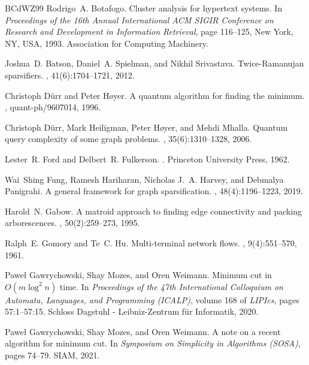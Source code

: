 \documentclass[10pt,a4paper]{article}
\newcommand{\1}{\mathbf{1}}
\theoremstyle{definition}
\begin{document}
\begin{thebibliography}{BCdWZ99}
Rodrigo~A. Botafogo.
\newblock Cluster analysis for hypertext systems.
\newblock In {\em Proceedings of the 16th Annual International ACM SIGIR
  Conference on Research and Development in Information Retrieval}, page
  116–125, New York, NY, USA, 1993. Association for Computing Machinery.

Joshua~D. Batson, Daniel~A. Spielman, and Nikhil Srivastava.
\newblock Twice-{R}amanujan sparsifiers.
, 41(6):1704--1721, 2012.

Christoph D{\"{u}}rr and Peter H{\o}yer.
\newblock A quantum algorithm for finding the minimum.
, quant-ph/9607014, 1996.

Christoph D{\"{u}}rr, Mark Heiligman, Peter H{\o}yer, and Mehdi Mhalla.
\newblock Quantum query complexity of some graph problems.
, 35(6):1310--1328, 2006.

Lester~R. Ford and Delbert~R. Fulkerson.
.
\newblock Princeton University Press, 1962.

Wai~Shing Fung, Ramesh Hariharan, Nicholas J.~A. Harvey, and Debmalya
  Panigrahi.
\newblock A general framework for graph sparsification.
, 48(4):1196--1223, 2019.

Harold~N. Gabow.
\newblock A matroid approach to finding edge connectivity and packing
  arborescences.
, 50(2):259--273, 1995.

Ralph~E. Gomory and Te~C. Hu.
\newblock Multi-terminal network flows.
,
  9(4):551--570, 1961.

Pawe{\l} Gawrychowski, Shay Mozes, and Oren Weimann.
\newblock Minimum cut in ${O}(m \log^2 n)$ time.
\newblock In {\em Proceedings of the 47th International Colloquium on Automata,
  Languages, and Programming (ICALP)}, volume 168 of {\em LIPIcs}, pages
  57:1--57:15. Schloss Dagstuhl - Leibniz-Zentrum f{\"{u}}r Informatik, 2020.
 
Pawe{\l} Gawrychowski, Shay Mozes, and Oren Weimann.
\newblock A note on a recent algorithm for minimum cut.
\newblock In {\em Symposium on Simplicity in Algorithms (SOSA)}, pages 74--79.
  SIAM, 2021.


\end{thebibliography}
\end{document}

